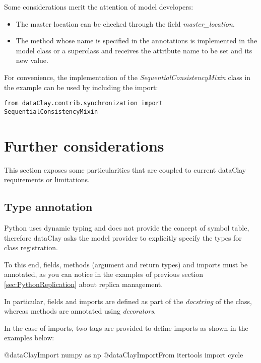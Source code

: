 Some considerations merit the attention of model developers:

\begin{itemize}
    \item The master location can be checked through the field \textit{master\_location}.
    \item The method whose name is specified in the annotations is implemented in the model class or a superclass and receives the attribute name to be set and its new value.
\end{itemize}

For convenience,  the implementation of the \textit{SequentialConsistencyMixin} class in the example can be used by including the import:

\colorbox{basecolor!20}{\texttt{from dataClay.contrib.synchronization import SequentialConsistencyMixin}}

\FEDERATION{

}

\section{Further considerations}
\label{sec:PythonConsiderations}

This section exposes some particularities that are coupled to current dataClay requirements or limitations.

\subsection{Type annotation}

Python uses dynamic typing and does not provide the concept of symbol table, therefore dataClay asks the model provider to explicitly specify the types for class registration.

To this end, fields, methods (argument and return types) and imports must be annotated, as you can notice in the examples of previous section \ref{sec:PythonReplication} about replica management. 

In particular, fields and imports are defined as part of the \textit{docstring} of the class, whereas methods are annotated using \textit{decorators}. 

In the case of imports, two tags are provided to define imports as shown in the examples below:

\begin{tBox}
 \begin{python}
  @dataClayImport numpy as np
  @dataClayImportFrom itertools import cycle
 \end{python}
\end{tBox}

